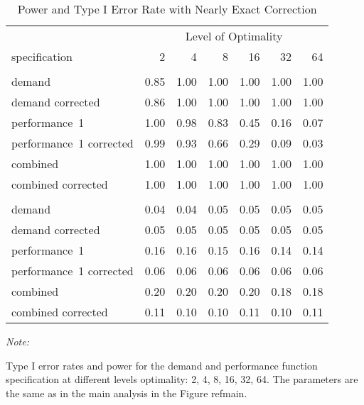 \begin{table}

\caption{\label{tab:nearly-table}Power and Type I Error Rate with Nearly Exact Correction}
\centering
\fontsize{9}{11}\selectfont
\begin{threeparttable}
\begin{tabular}[t]{lrrrrrr}
\toprule
\multicolumn{1}{c}{ } & \multicolumn{6}{c}{Level of Optimality} \\
\cmidrule(l{3pt}r{3pt}){2-7}
specification & 2 & 4 & 8 & 16 & 32 & 64\\
\midrule
\addlinespace[0.3em]
\multicolumn{7}{c}{\textbf{Power}}\\
\hspace{1em}demand & 0.85 & 1.00 & 1.00 & 1.00 & 1.00 & 1.00\\
\hspace{1em}demand corrected & 0.86 & 1.00 & 1.00 & 1.00 & 1.00 & 1.00\\
\hspace{1em}performance~1 & 1.00 & 0.98 & 0.83 & 0.45 & 0.16 & 0.07\\
\hspace{1em}performance~1 corrected & 0.99 & 0.93 & 0.66 & 0.29 & 0.09 & 0.03\\
\hspace{1em}combined & 1.00 & 1.00 & 1.00 & 1.00 & 1.00 & 1.00\\
\hspace{1em}combined corrected & 1.00 & 1.00 & 1.00 & 1.00 & 1.00 & 1.00\\
\addlinespace[0.3em]
\multicolumn{7}{c}{\textbf{Type I}}\\
\hspace{1em}demand & 0.04 & 0.04 & 0.05 & 0.05 & 0.05 & 0.05\\
\hspace{1em}demand corrected & 0.05 & 0.05 & 0.05 & 0.05 & 0.05 & 0.05\\
\hspace{1em}performance~1 & 0.16 & 0.16 & 0.15 & 0.16 & 0.14 & 0.14\\
\hspace{1em}performance~1 corrected & 0.06 & 0.06 & 0.06 & 0.06 & 0.06 & 0.06\\
\hspace{1em}combined & 0.20 & 0.20 & 0.20 & 0.20 & 0.18 & 0.18\\
\hspace{1em}combined corrected & 0.11 & 0.10 & 0.10 & 0.11 & 0.10 & 0.11\\
\bottomrule
\end{tabular}
\begin{tablenotes}
\item \textit{Note: } 
\item Type I error rates and power for the demand and
  performance function specification at different levels optimality:
  2, 4, 8, 16, 32, 64. The parameters are the same as in the main
  analysis in the Figure ref{main}.
\end{tablenotes}
\end{threeparttable}
\end{table}